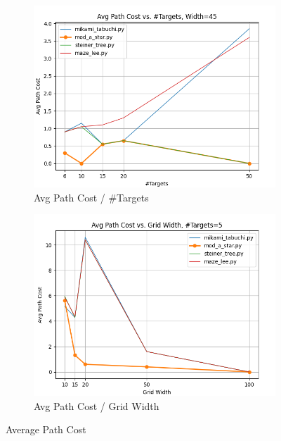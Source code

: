 \begin{figure}
\centering

\begin{subfigure}[b]{\linewidth}
    \includegraphics[width=\linewidth]{figures/plots/avgCost_areaConst.png}
    \caption{Avg Path Cost / \#Targets}
\end{subfigure}
\begin{subfigure}[b]{\linewidth}
    \includegraphics[width=\linewidth]{figures/plots/avgCost_nConst.png}
    \caption{Avg Path Cost / Grid Width}
\end{subfigure}

\caption{Average Path Cost}
\label{fig:avgCost}
\end{figure}

